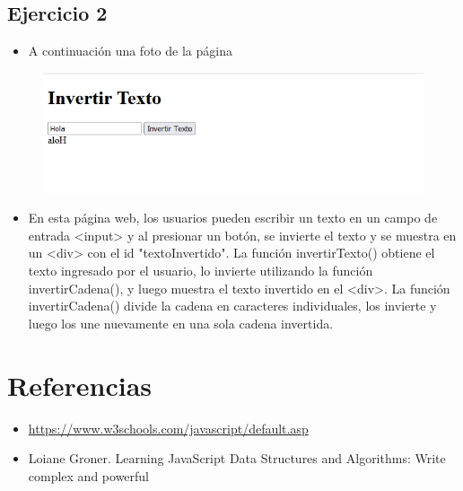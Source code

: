 \documentclass{article}
\begin{document}
	\subsection{Ejercicio 2}
		
	\begin{itemize}
			\item A continuación una foto de la página
		\end{itemize} 
		\begin{figure}[H]
			\centering
			\includegraphics[width=1.0\textwidth,keepaspectratio]{img/ejercicio2.PNG}
		\end{figure}
		\begin{itemize}
			\item En esta página web, los usuarios pueden escribir un texto en un campo de entrada <input> y al presionar un botón, se invierte el texto y se muestra en un <div> con el id "textoInvertido". La función invertirTexto() obtiene el texto ingresado por el usuario, lo invierte utilizando la función invertirCadena(), y luego muestra el texto invertido en el <div>. La función invertirCadena() divide la cadena en caracteres individuales, los invierte y luego los une nuevamente en una sola cadena invertida.
		\end{itemize} 
\section{Referencias}
\begin{itemize}			
	\item \url{https://www.w3schools.com/javascript/default.asp}
	\item	Loiane Groner. Learning JavaScript Data Structures and Algorithms: Write complex and powerful
\end{itemize}	
	
%
%
%
			
\end{document}
